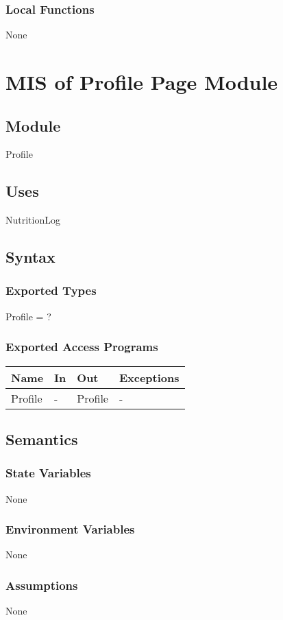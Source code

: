 \documentclass[12pt, titlepage]{article}
\begin{document}
\subsubsection{Local Functions}
None

\newpage

\section{MIS of Profile Page Module} \label{ProfilePage}
\subsection{Module}
Profile
\subsection{Uses}
NutritionLog
\subsection{Syntax}
\subsubsection{Exported Types}
Profile = ?
\subsubsection{Exported Access Programs}
\begin{center}
	\begin{tabular}{p{2cm} p{4cm} p{4cm} p{2cm}}
		\hline
		\textbf{Name} & \textbf{In} & \textbf{Out} & \textbf{Exceptions} \\
		\hline
		Profile & - & Profile & - \\
		\hline
	\end{tabular}
\end{center}
\subsection{Semantics}
\subsubsection{State Variables}
None
\subsubsection{Environment Variables}
None
\subsubsection{Assumptions}
None
\end{document}
